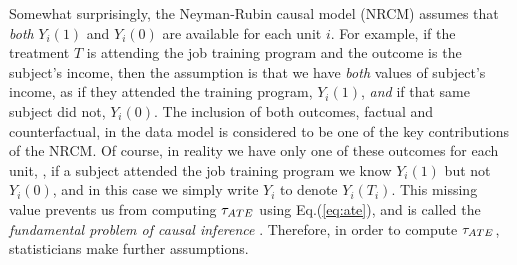 Somewhat surprisingly, the Neyman-Rubin causal model (NRCM) assumes that {\em both} $Y_i(1)$ and
$Y_i(0)$ are available for each unit $i$.  For example, if the
treatment $T$ is attending the job training program and the outcome is the subject's income,
then the assumption is that we have {\em both} values of subject's income, as if they
attended the training program, $Y_i(1)$, {\em and} if that same subject did not, $Y_i(0)$.  The inclusion of both
outcomes, factual and counterfactual, in the data model is considered
to be one of the key contributions of the NRCM.
Of course, in reality we have only one of these outcomes for each
unit, \eg, if a subject attended the job training program we know
$Y_i(1)$ but not $Y_i(0)$, and in this case we simply write $Y_i$ to
denote $Y_i(T_i)$.  This missing value prevents us from computing
${\tau_{ATE}}$ using Eq.(\ref{eq:ate}), and is called the {\em fundamental
  problem of causal inference} \cite{Holland1986}.  Therefore, in
order to compute ${\tau_{ATE}}$, statisticians make further assumptions.


\vspace{-0.3cm}
